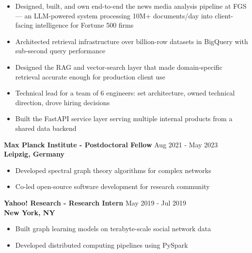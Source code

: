 \documentclass[11pt,a4paper]{article}
\newlength{\spacexs}    \setlength{\spacexs}{6pt}      %
\newlength{\spacemd}    \setlength{\spacemd}{19pt}     %
\newcommand{\bodytext}[1]{%
    {\fontsize{10pt}{14pt}\selectfont\color{charcoal} #1}%
}
\newcommand{\microtext}[1]{%
    {\fontsize{8pt}{11pt}\selectfont\color{mediumgray} #1}%
}
\newcommand{\verdigrisbullet}{{\color{verdigris}$\bullet$}\space}
\newcommand{\jobduration}[1]{%
    {\fontspec{JetBrains Mono}\microtext{#1}}
}
\newcommand{\companyname}[1]{%
    {\color{darkgray}\bfseries #1}
}
\begin{document}
\vspace{\spacexs}
\begin{itemize}[leftmargin=15pt,itemindent=0pt,labelwidth=10pt,labelsep=5pt,itemsep=2pt,parsep=0pt,topsep=0pt,partopsep=0pt]
    \item[\verdigrisbullet] \bodytext{Designed, built, and own end-to-end the news media analysis pipeline at FGS — an LLM-powered system processing 10M+ documents/day into client-facing intelligence for Fortune 500 firms}
    \item[\verdigrisbullet] \bodytext{Architected retrieval infrastructure over billion-row datasets in BigQuery with sub-second query performance}
    \item[\verdigrisbullet] \bodytext{Designed the RAG and vector-search layer that made domain-specific retrieval accurate enough for production client use}
    \item[\verdigrisbullet] \bodytext{Technical lead for a team of 6 engineers: set architecture, owned technical direction, drove hiring decisions}
    \item[\verdigrisbullet] \bodytext{Built the FastAPI service layer serving multiple internal products from a shared data backend}
\end{itemize}

\vspace{\spacemd}

\bodytext{\textbf{Max Planck Institute - Postdoctoral Fellow}} \hfill \jobduration{Aug 2021 - May 2023}\\
\companyname{Leipzig, Germany}

\vspace{\spacexs}
\begin{itemize}[leftmargin=15pt,itemindent=0pt,labelwidth=10pt,labelsep=5pt,itemsep=1pt,parsep=0pt,topsep=0pt,partopsep=0pt]
    \item[\verdigrisbullet] \bodytext{Developed spectral graph theory algorithms for complex networks}
    \item[\verdigrisbullet] \bodytext{Co-led open-source software development for research community}
\end{itemize}

\vspace{\spacemd}

\bodytext{\textbf{Yahoo! Research - Research Intern}} \hfill \jobduration{May 2019 - Jul 2019}\\
\companyname{New York, NY}

\vspace{\spacexs}
\begin{itemize}[leftmargin=15pt,itemindent=0pt,labelwidth=10pt,labelsep=5pt,itemsep=1pt,parsep=0pt,topsep=0pt,partopsep=0pt]
    \item[\verdigrisbullet] \bodytext{Built graph learning models on terabyte-scale social network data}
    \item[\verdigrisbullet] \bodytext{Developed distributed computing pipelines using PySpark}
\end{itemize}
\end{document}
